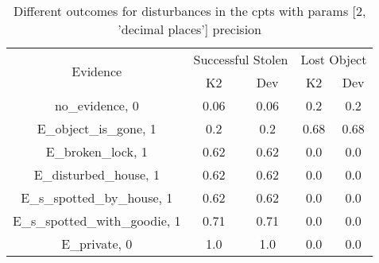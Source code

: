 \begin{table}\begin{tabular}{c|cc|cc}\toprule\multirow{2}{*}{Evidence} & \multicolumn{2}{c}{Successful Stolen} & \multicolumn{2}{c}{Lost Object} \\& {K2} & {Dev} & {K2} & {Dev} \\\midrule
no\_evidence, 0 & 0.06&0.06&0.2&0.2\\E\_object\_is\_gone, 1 & 0.2&0.2&0.68&0.68\\E\_broken\_lock, 1 & 0.62&0.62&0.0&0.0\\E\_disturbed\_house, 1 & 0.62&0.62&0.0&0.0\\E\_s\_spotted\_by\_house, 1 & 0.62&0.62&0.0&0.0\\E\_s\_spotted\_with\_goodie, 1 & 0.71&0.71&0.0&0.0\\E\_private, 0 & 1.0&1.0&0.0&0.0\\\bottomrule\end{tabular}\caption{Different outcomes for disturbances in the cpts with params [2, 'decimal places'] precision}\end{table}